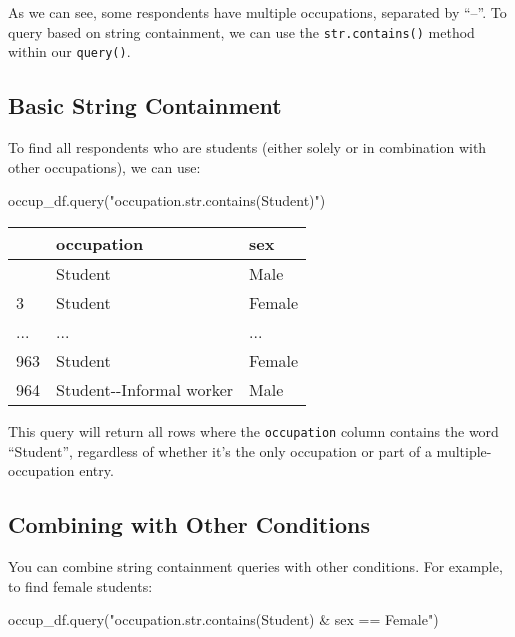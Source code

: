 \documentclass[
  letterpaper,
  DIV=11,
  numbers=noendperiod]{scrreprt}
\newenvironment{Shaded}{\begin{snugshade}}{\end{snugshade}}
\newcommand{\NormalTok}[1]{\textcolor[rgb]{0.00,0.23,0.31}{#1}}
\newcommand{\StringTok}[1]{\textcolor[rgb]{0.13,0.47,0.30}{#1}}
\begin{document}
As we can see, some respondents have multiple occupations, separated by
``--''. To query based on string containment, we can use the
\texttt{str.contains()} method within our \texttt{query()}.

\subsection{Basic String Containment}\label{basic-string-containment}

To find all respondents who are students (either solely or in
combination with other occupations), we can use:

\begin{Shaded}
\begin{Highlighting}[]
\NormalTok{occup\_df.query(}\StringTok{"occupation.str.contains(\textquotesingle{}Student\textquotesingle{})"}\NormalTok{)}
\end{Highlighting}
\end{Shaded}

\begin{longtable}[]{@{}lll@{}}
\toprule\noalign{}
& occupation & sex \\
\midrule\noalign{}
\endhead
\bottomrule\noalign{}
\endlastfoot
2 & Student & Male \\
3 & Student & Female \\
... & ... & ... \\
963 & Student & Female \\
964 & Student-\/-Informal worker & Male \\
\end{longtable}

This query will return all rows where the \texttt{occupation} column
contains the word ``Student'', regardless of whether it's the only
occupation or part of a multiple-occupation entry.

\subsection{Combining with Other
Conditions}\label{combining-with-other-conditions}

You can combine string containment queries with other conditions. For
example, to find female students:

\begin{Shaded}
\begin{Highlighting}[]
\NormalTok{occup\_df.query(}\StringTok{"occupation.str.contains(\textquotesingle{}Student\textquotesingle{}) \& sex == \textquotesingle{}Female\textquotesingle{}"}\NormalTok{)}
\end{Highlighting}
\end{Shaded}
\end{document}
